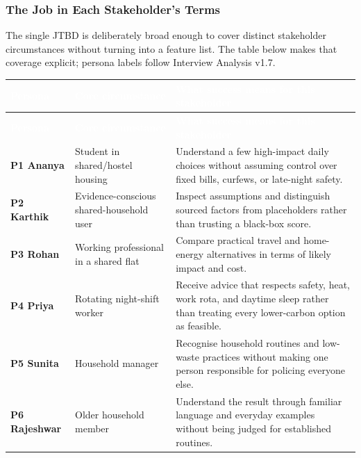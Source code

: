 \documentclass[12pt, a4paper]{article}
\begin{document}
\subsubsection{The Job in Each Stakeholder's Terms}
The single JTBD is deliberately broad enough to cover distinct stakeholder circumstances without turning into a feature list. The table below makes that coverage explicit; persona labels follow Interview Analysis v1.7.
{\small
{}
\begin{longtable}{|>{\raggedright\arraybackslash}p{2.1cm}|>{\raggedright\arraybackslash}p{3.0cm}|>{\raggedright\arraybackslash}p{12.3cm}|}
\hline
\rowcolor{cNavy}
\textcolor{white}{\textbf{Persona}} & \textcolor{white}{\textbf{Core circumstance}} & \textcolor{white}{\textbf{What success means for this stakeholder}} \\
\hline
\endfirsthead
\hline
\rowcolor{cNavy}
\textcolor{white}{\textbf{Persona}} & \textcolor{white}{\textbf{Core circumstance}} & \textcolor{white}{\textbf{What success means for this stakeholder}} \\
\hline
\endhead
\textbf{P1 Ananya} & Student in shared/hostel housing & Understand a few high-impact daily choices without assuming control over fixed bills, curfews, or late-night safety. \\
\hline
\textbf{P2 Karthik} & Evidence-conscious shared-household user & Inspect assumptions and distinguish sourced factors from placeholders rather than trusting a black-box score. \\
\hline
\textbf{P3 Rohan} & Working professional in a shared flat & Compare practical travel and home-energy alternatives in terms of likely impact and cost. \\
\hline
\textbf{P4 Priya} & Rotating night-shift worker & Receive advice that respects safety, heat, work rota, and daytime sleep rather than treating every lower-carbon option as feasible. \\
\hline
\textbf{P5 Sunita} & Household manager & Recognise household routines and low-waste practices without making one person responsible for policing everyone else. \\
\hline
\textbf{P6 Rajeshwar} & Older household member & Understand the result through familiar language and everyday examples without being judged for established routines. \\
\hline
\end{longtable}
}
\end{document}
